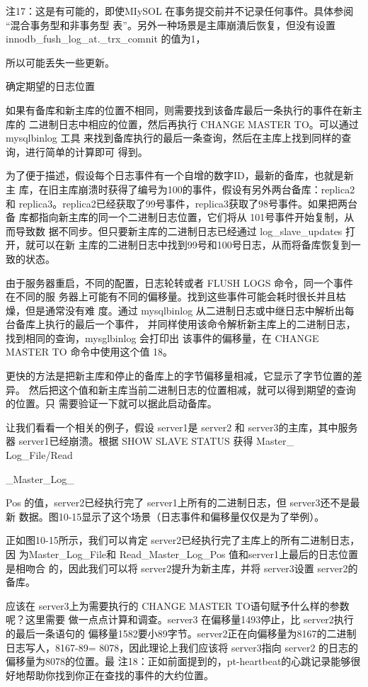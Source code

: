 注17：这是有可能的，即使MIySOL 在事务提交前并不记录任何事件。具体参阅 “混合事务型和非事务型
表”。另外一种场景是主庫崩潰后恢复，但没有设置 innodb\_fush\_log\_at.\_trx\_comnit 的值为1，

所以可能丢失一些更新。

确定期望的日志位置

如果有备库和新主库的位置不相同，则需要找到该备库最后一条执行的事件在新主库的
二进制日志中相应的位置，然后再执行 CHANGE MASTER TO。可以通过 mysqlbinlog 工具
来找到备库执行的最后一条查询，然后在主库上找到同样的查询，进行简单的计算即可
得到。

为了便于描述，假设每个日志事件有一个自增的数字ID，最新的备库，也就是新主
库，在旧主库崩溃时获得了编号为100的事件，假设有另外两台备库：replica2和
replica3。replica2已经获取了99号事件，replica3获取了98号事件。如果把两台备
库都指向新主库的同一个二进制日志位置，它们将从 101号事件开始复制，从而导致数
据不同步。但只要新主库的二进制日志已经通过 log\_slave\_updates 打开，就可以在新
主库的二进制日志中找到99号和100号日志，从而将备库恢复到一致的状态。

由于服务器重启，不同的配置，日志轮转或者 FLUSH LOGS 命令，同一个事件在不同的服
务器上可能有不同的偏移量。找到这些事件可能会耗时很长并且枯燥，但是通常没有难
度。通过 mysqlbinlog 从二进制日志或中继日志中解析出每台备库上执行的最后一个事件，
并同样使用该命令解析新主库上的二进制日志，找到相同的查询，mysglbinlog 会打印出
该事件的偏移量，在 CHANGE MASTER TO 命令中使用这个值 18。

更快的方法是把新主库和停止的备库上的字节偏移量相减，它显示了字节位置的差异。
然后把这个值和新主库当前二进制日志的位置相减，就可以得到期望的查询的位置。只
需要验证一下就可以据此启动备库。

让我们看看一个相关的例子，假设 server1是 server2 和 server3的主库，其中服务器
server1已经崩溃。根据 SHOW SLAVE STATUS 获得 Master\_ Log\_File/Read

\_Master\_Log\_

Pos 的值，server2已经执行完了 server1上所有的二进制日志，但 server3还不是最新
数据。图10-15显示了这个场景（日志事件和偏移量仅仅是为了举例）。

正如图10-15所示，我们可以肯定 server2已经执行完了主库上的所有二进制日志，因
为Master\_Log\_File和 Read\_Master\_Log\_Pos 值和server1上最后的日志位置是相吻合
的，因此我们可以将 server2提升为新主库，并将 server3设置 server2的备库。

应该在 server3上为需要执行的 CHANGE MASTER TO语句赋予什么样的参数呢？这里需要
做一点点计算和调查。server3 在偏移量1493停止，比 server2执行的最后一条语句的
偏移量1582要小89字节。server2正在向偏移量为8167的二进制日志写人，8167-89=
8078，因此理论上我们应该将 server3指向 server2 的日志的偏移量为8078的位置。最
注18：正如前面提到的，pt-heartbeat的心跳记录能够很好地帮助你找到你正在查找的事件的大约位置。

